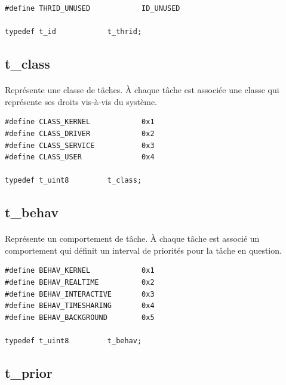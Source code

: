 \documentclass[10pt,a4wide]{article}
\begin{document}
\begin{verbatim}
#define THRID_UNUSED            ID_UNUSED

typedef t_id            t_thrid;
\end{verbatim}

\subsection{t\_class}

\paragraph{}

Repr\'esente une classe de t\^aches. \`A chaque t\^ache est associ\'ee une
classe qui repr\'esente ses droits vis-\`a-vis du syst\`eme.

\begin{verbatim}
#define CLASS_KERNEL            0x1
#define CLASS_DRIVER            0x2
#define CLASS_SERVICE           0x3
#define CLASS_USER              0x4

typedef t_uint8         t_class;
\end{verbatim}

\subsection{t\_behav}

\paragraph{}

Repr\'esente un comportement de t\^ache. \`A chaque t\^ache est associ\'e
un comportement qui d\'efinit un interval de priorit\'es pour la t\^ache
en question.

\begin{verbatim}
#define BEHAV_KERNEL            0x1
#define BEHAV_REALTIME          0x2
#define BEHAV_INTERACTIVE       0x3
#define BEHAV_TIMESHARING       0x4
#define BEHAV_BACKGROUND        0x5

typedef t_uint8         t_behav;
\end{verbatim}

\subsection{t\_prior}

\paragraph{}
\end{document}
